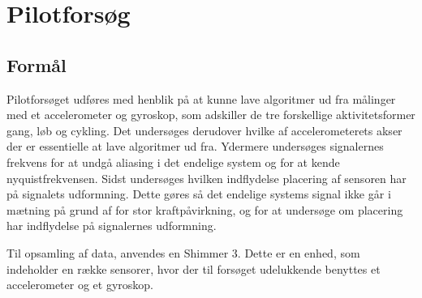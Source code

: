 \chapter{Pilotforsøg}\vspace{-.75cm}\label{pilot}
\section{Formål}
Pilotforsøget udføres med henblik på at kunne lave algoritmer ud fra målinger med et accelerometer og gyroskop, som adskiller de tre forskellige aktivitetsformer gang, løb og cykling. Det undersøges derudover hvilke af accelerometerets akser der er essentielle at lave algoritmer ud fra. Ydermere undersøges signalernes frekvens for at undgå aliasing i det endelige system og for at kende nyquistfrekvensen. Sidst undersøges hvilken indflydelse placering af sensoren har på signalets udformning. Dette gøres så det endelige systems signal ikke går i mætning på grund af for stor kraftpåvirkning, og for at undersøge om placering har indflydelse på signalernes udformning.

Til opsamling af data, anvendes en Shimmer 3. Dette er en enhed, som indeholder en række sensorer, hvor der til forsøget udelukkende benyttes et accelerometer og et gyroskop. 



